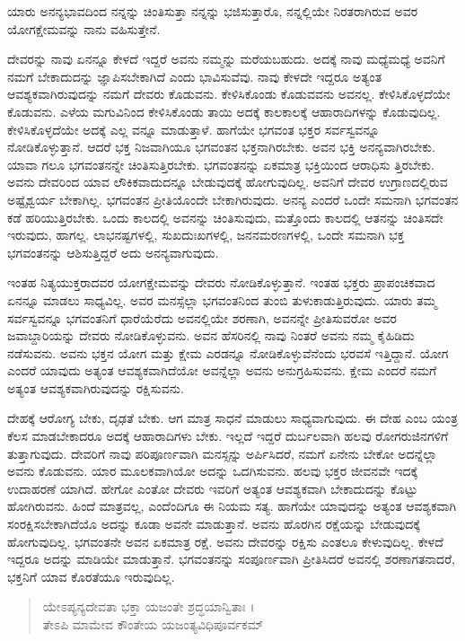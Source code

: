 {\small ಯಾರು ಅನನ್ಯಭಾವದಿಂದ ನನ್ನನ್ನು ಚಿಂತಿಸುತ್ತಾ ನನ್ನನ್ನು ಭಜಿಸುತ್ತಾರೊ, ನನ್ನಲ್ಲಿಯೇ ನಿರತರಾಗಿರುವ ಅವರ ಯೋಗಕ್ಷೇಮವನ್ನು ನಾನು ವಹಿಸುತ್ತೇನೆ.}

ದೇವರನ್ನು ನಾವು ಏನನ್ನೂ ಕೇಳದೆ ಇದ್ದರೆ ಅವನು ನಮ್ಮನ್ನು ಮರೆಯಬಹುದು. ಅದಕ್ಕೆ ನಾವು ಮಧ್ಯೆಮಧ್ಯೆ ಅವನಿಗೆ ನಮಗೆ ಬೇಕಾದುದನ್ನು ಜ್ಞಾಪಿಸಬೇಕಾಗಿದೆ ಎಂದು ಭಾವಿಸುವೆವು. ನಾವು ಕೇಳದೇ ಇದ್ದರೂ ಅತ್ಯಂತ ಆವಶ್ಯಕವಾಗಿರುವುದನ್ನು ನಮಗೆ ದೇವರು ಕೊಡುವನು. ಕೇಳಿಸಿಕೊಂಡು ಕೊಡುವವನು ಅವನಲ್ಲ. ಕೇಳಿಸಿಕೊಳ್ಳದೆಯೇ ಕೊಡುವನು. ಎಳೆಯ ಮಗುವಿನಿಂದ ಕೇಳಿಸಿಕೊಂಡು ತಾಯಿ ಅದಕ್ಕೆ ಕಾಲಕಾಲಕ್ಕೆ ಆಹಾರಾದಿಗಳನ್ನು ಕೊಡುವುದಿಲ್ಲ. ಕೇಳಿಸಿಕೊಳ್ಳದೆಯೇ ಅದಕ್ಕೆ ಎಲ್ಲ ವನ್ನೂ ಮಾಡುತ್ತಾಳೆ. ಹಾಗೆಯೇ ಭಗವಂತ ಭಕ್ತರ ಸರ್ವಸ್ವವನ್ನೂ ನೋಡಿಕೊಳ್ಳುತ್ತಾನೆ. ಆದರೆ ಭಕ್ತ ನಿಜವಾಗಿಯೂ ಭಗವಂತನ ಭಕ್ತನಾಗಿರಬೇಕು. ಅವನ ಭಕ್ತಿ ಅನನ್ಯವಾಗಿರಬೇಕು. ಯಾವಾ ಗಲೂ ಭಗವಂತನನ್ನೇ ಚಿಂತಿಸುತ್ತಿರಬೇಕು. ಭಗವಂತನನ್ನು ಏಕಮಾತ್ರ ಭಕ್ತಿಯಿಂದ ಆರಾಧಿಸು ತ್ತಿರಬೇಕು. ಅವನು ದೇವರಿಂದ ಯಾವ ಲೌಕಿಕವಾದುದನ್ನೂ ಬೇಡುವುದಕ್ಕೆ ಹೋಗುವುದಿಲ್ಲ. ಅವನಿಗೆ ದೇವರ ಉಗ್ರಾಣದಲ್ಲಿರುವ ಅಷ್ಟೈಶ್ವರ್ಯ ಬೇಕಾಗಿಲ್ಲ. ಭಗವಂತನ ಪ್ರೀತಿಯೊಂದೇ ಬೇಕಾಗಿರುವುದು. ಅನನ್ಯ ಎಂದರೆ ಒಂದೇ ಸಮನಾಗಿ ಭಗವಂತನ ಕಡೆ ಹರಿಯುತ್ತಿರಬೇಕು. ಒಂದು ಕಾಲದಲ್ಲಿ ಅವನನ್ನು ಚಿಂತಿಸುವುದು, ಮತ್ತೊಂದು ಕಾಲದಲ್ಲಿ ಆತನನ್ನು ಚಿಂತಿಸದೇ ಇರುವುದು, ಹಾಗಲ್ಲ. ಲಾಭನಷ್ಟಗಳಲ್ಲಿ, ಸುಖದುಃಖಗಳಲ್ಲಿ, ಜನನಮರಣಗಳಲ್ಲಿ, ಒಂದೇ ಸಮನಾಗಿ ಭಕ್ತ ಭಗವಂತನನ್ನು ಆಶಿಸುತ್ತಿದ್ದರೆ ಅದು ಅನನ್ಯವಾಗುವುದು.

ಇಂತಹ ನಿತ್ಯಯುಕ್ತರಾದವರ ಯೋಗಕ್ಷೇಮವನ್ನು ದೇವರು ನೋಡಿಕೊಳ್ಳುತ್ತಾನೆ. ಇಂತಹ ಭಕ್ತರು ಪ್ರಾಪಂಚಿಕವಾದ ಏನನ್ನೂ ಮಾಡಲು ಸಾಧ್ಯವಿಲ್ಲ. ಅವರ ಮನಸ್ಸೆಲ್ಲಾ ಭಗವಂತನಿಂದ ತುಂಬಿ ತುಳುಕಾಡುತ್ತಿರುವುದು. ಯಾರು ತಮ್ಮ ಸರ್ವಸ್ವವನ್ನೂ ಭಗವಂತನಿಗೆ ಧಾರೆಯೆರೆದು ಅವನಲ್ಲಿಯೇ ಶರಣಾಗಿ, ಅವನನ್ನೇ ಪ್ರೀತಿಸುವರೋ ಅವರ ಜವಾಬ್ದಾರಿಯನ್ನು ದೇವರು ನೋಡಿಕೊಳ್ಳುವನು. ಅವನ ಹೆಸರಿನಲ್ಲಿ ನಾವು ನಿಂತರೆ ಅವನು ನಮ್ಮ ಕೈಹಿಡಿದು ನಡೆಸುವನು. ಅವನು ಭಕ್ತನ ಯೋಗ ಮತ್ತು ಕ್ಷೇಮ ಎರಡನ್ನೂ ನೋಡಿಕೊಳ್ಳುವೆನೆಂದು ಭರವಸೆ ಇತ್ತಿದ್ದಾನೆ. ಯೋಗ ಎಂದರೆ ಯಾವುದು ಅತ್ಯಂತ ಆವಶ್ಯಕವಾಗಿದೆಯೋ ಅವನ್ನೆಲ್ಲಾ ಅವನು ಅನುಗ್ರಹಿಸುವನು. ಕ್ಷೇಮ ಎಂದರೆ ನಮಗೆ ಅತ್ಯಂತ ಆವಶ್ಯಕವಾಗಿರುವುದನ್ನು ರಕ್ಷಿಸುವನು.

ದೇಹಕ್ಕೆ ಆರೋಗ್ಯ ಬೇಕು, ದೃಢತೆ ಬೇಕು. ಆಗ ಮಾತ್ರ ಸಾಧನೆ ಮಾಡುಲು ಸಾಧ್ಯವಾಗುವುದು. ಈ ದೇಹ ಎಂಬ ಯಂತ್ರ ಕೆಲಸ ಮಾಡಬೇಕಾದರೂ ಅದಕ್ಕೆ ಆಹಾರಾದಿಗಳು ಬೇಕು. ಇಲ್ಲದೆ ಇದ್ದರೆ ದುರ್ಬಲವಾಗಿ ಹಲವು ರೋಗರುಜಿನಗಳಿಗೆ ತುತ್ತಾಗುವುದು. ದೇವರಿಗೆ ನಾವು ಪರಿಪೂರ್ಣವಾಗಿ ಮನಸ್ಸನ್ನು ಅರ್ಪಿಸಿದರೆ, ನಮಗೆ ಏನೇನು ಬೇಕೋ ಅದನ್ನೆಲ್ಲಾ ಅವನು ಕೊಡುವನು. ಯಾರ ಮೂಲಕವಾಗಿಯೋ ಅದನ್ನು ಒದಗಿಸುವನು. ಹಲವು ಭಕ್ತರ ಜೀವನವೇ ಇದಕ್ಕೆ ಉದಾಹರಣೆ ಯಾಗಿದೆ. ಹೇಗೋ ಎಂತೋ ದೇವರು ಇವರಿಗೆ ಅತ್ಯಂತ ಆವಶ್ಯಕವಾಗಿ ಬೇಕಾದುದನ್ನು ಕೊಟ್ಟು ಹೋಗಿರುವನು. ಹಿಂದೆ ಮಾತ್ರವಲ್ಲ, ಎಂದೆಂದಿಗೂ ಈ ನಿಯಮ ಸತ್ಯ. ಹಾಗೆಯೇ ಯಾವುದನ್ನು ಅತ್ಯಂತ ಆವಶ್ಯಕವಾಗಿ ಸಂರಕ್ಷಿಸಬೇಕಾಗಿದೆಯೊ ಅದನ್ನು ಕೂಡಾ ಅವನೇ ಮಾಡುತ್ತಾನೆ. ಅವನು ಹೊರಗಿನ ರಕ್ಷೆಯನ್ನು ಬೇಡುವುದಕ್ಕೆ ಹೋಗುವುದಿಲ್ಲ. ಭಗವಂತನೇ ಅವನ ಏಕಮಾತ್ರ ರಕ್ಷೆ. ಅವನು ದೇವರನ್ನು ರಕ್ಷಿಸು ಎಂತಲೂ ಕೇಳುವುದಿಲ್ಲ. ಕೇಳದೆ ಇದ್ದರೂ ಅದನ್ನು ಮಾಡಿಯೇ ಮಾಡುತ್ತಾನೆ. ಭಗವಂತನನ್ನು ಸಂಪೂರ್ಣವಾಗಿ ಪ್ರೀತಿಸಿದರೆ ಅವನಲ್ಲಿ ಶರಣಾಗತನಾದರೆ, ಭಕ್ತನಿಗೆ ಯಾವ ಕೊರತೆಯೂ ಇರುವುದಿಲ್ಲ.

\begin{verse}
ಯೇಽಪ್ಯನ್ಯದೇವತಾ ಭಕ್ತಾ ಯಜಂತೇ ಶ್ರದ್ಧಯಾನ್ವಿತಾಃ ।\\ತೇಽಪಿ ಮಾಮೇವ ಕೌಂತೇಯ ಯಜಂತ್ಯವಿಧಿಪೂರ್ವಕಮ್ 
\end{verse}


